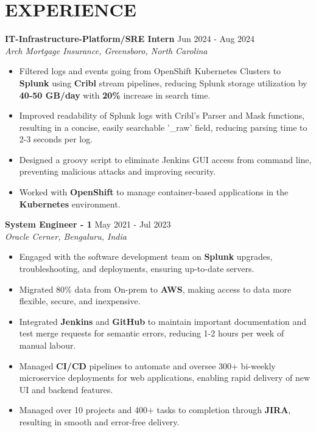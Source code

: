 \documentclass[a4paper,9pt]{extarticle}
\begin{document}
\section*{EXPERIENCE}
\noindent
\textbf{IT-Infrastructure-Platform/SRE Intern}
\hfill Jun 2024 - Aug 2024\\ %
\textit{Arch Mortgage Insurance, Greensboro, North Carolina}
\begin{itemize}
    \item Filtered logs and events going from OpenShift Kubernetes Clusters to \textbf{Splunk} using \textbf{Cribl} stream pipelines, reducing Splunk storage utilization by \textbf{40-50 GB/day} with \textbf{20\%} increase in search time.
    \item Improved readability of Splunk logs with Cribl's Parser and Mask functions, resulting in a concise, easily searchable '\_raw' field, reducing parsing time to 2-3 seconds per log.
    \item Designed a groovy script to eliminate Jenkins GUI access from command line, preventing malicious attacks and improving security.
    \item Worked with \textbf{OpenShift} to manage container-based applications in the \textbf{Kubernetes} environment.
    

\end{itemize}

\noindent
\textbf{System Engineer - 1}
\hfill May 2021 - Jul 2023\\ %
\textit{Oracle Cerner, Bengaluru, India}
\begin{itemize}
    \item Engaged with the software development team on \textbf{Splunk} upgrades, troubleshooting, and deployments, ensuring up-to-date servers.
    \item Migrated 80\% data from On-prem to \textbf{AWS}, making access to data more flexible, secure, and inexpensive.
    \item Integrated \textbf{Jenkins} and \textbf{GitHub} to maintain important documentation and test merge requests for semantic errors, reducing 1-2 hours per week of manual labour.
    \item Managed \textbf{CI/CD} pipelines to automate and oversee 300+ bi-weekly microservice deployments for web applications, enabling rapid delivery of new UI and backend features.
    \item Managed over 10 projects and 400+ tasks to completion through \textbf{JIRA}, resulting in smooth and error-free delivery. 
\end{itemize}
\end{document}
